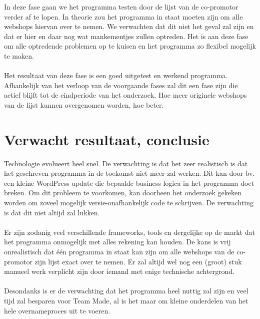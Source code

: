 In deze fase gaan we het programma testen door de lijst van de co-promotor verder af te lopen. In theorie zou het programma in staat moeten zijn om alle webshops hiervan over te nemen. We verwachten dat dit niet het geval zal zijn en dat er hier en daar nog wat mankementjes zullen optreden. Het is aan deze fase om alle optredende problemen op te kuisen en het programma zo flexibel mogelijk te maken.
\\\\
Het resultaat van deze fase is een goed uitgetest en werkend programma. Afhankelijk van het verloop van de voorgaande fases zal dit een fase zijn die actief blijft tot de eindperiode van het onderzoek. Hoe meer originele webshops van de lijst kunnen overgenomen worden, hoe beter.

\section{Verwacht resultaat, conclusie}%
\label{sec:verwachte_resultaten}

Technologie evolueert heel snel. De verwachting is dat het zeer realistisch is dat het geschreven programma in de toekomst niet meer zal werken. Dit kan door bv. een kleine WordPress update die bepaalde business logica in het programma doet breken. Om dit probleem te voorkomen, kan doorheen het onderzoek gekeken worden om zoveel mogelijk versie-onafhankelijk code te schrijven. De verwachting is dat dit niet altijd zal lukken.
\\\\
Er zijn zodanig veel verschillende frameworks, tools en dergelijke op de markt dat het programma onmogelijk met alles rekening kan houden. De kans is vrij onrealistisch dat één programma in staat kan zijn om alle webshops van de co-promotor zijn lijst exact over te nemen. Er zal altijd wel nog een (groot) stuk manueel werk verplicht zijn door iemand met enige technische achtergrond.   
\\\\
Desondanks is er de verwachting dat het programma heel nuttig zal zijn en veel tijd zal besparen voor Team Made, al is het maar om kleine onderdelen van het hele overnameproces uit te voeren.  
